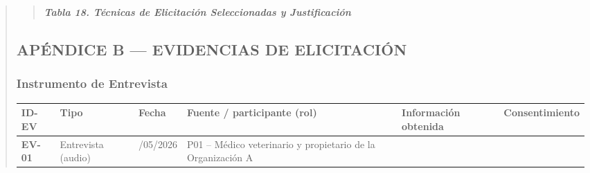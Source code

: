 \documentclass[
]{article}
\newcounter{none} %
\begin{document}
\begin{quote}
\begin{quote}
\protect{}\label{_bookmark74}{}\emph{\textbf{Tabla 18.
Técnicas de Elicitación Seleccionadas y Justificación}}
\end{quote}

\subsection{APÉNDICE B --- EVIDENCIAS DE
ELICITACIÓN}\label{apuxe9ndice-b-evidencias-de-elicitaciuxf3n}

\subsubsection{Instrumento de
Entrevista}\label{instrumento-de-entrevista}

{\def\LTcaptype{none} %
\begin{longtable}[]{|
  >{\raggedright\arraybackslash}p{}|
  >{\raggedright\arraybackslash}p{}|
  >{\centering\arraybackslash}p{}|
  >{\raggedright\arraybackslash}p{}|
  >{\raggedright\arraybackslash}p{}|
  >{\raggedright\arraybackslash}p{}|}
\hline
\begin{minipage}[b]{\linewidth}\raggedright
\textbf{ID-EV}
\end{minipage} & \begin{minipage}[b]{\linewidth}\centering
\textbf{Tipo}
\end{minipage} & \begin{minipage}[b]{\linewidth}\centering
\textbf{Fecha}
\end{minipage} & \begin{minipage}[b]{\linewidth}\raggedright
\textbf{Fuente / participante (rol)}
\end{minipage} & \begin{minipage}[b]{\linewidth}\raggedright
\textbf{Información obtenida}
\end{minipage} & \begin{minipage}[b]{\linewidth}\raggedright
\textbf{Consenti\-miento}
\end{minipage} \\
\hline
\endhead
\hline
\endlastfoot
\textbf{EV-01} & Entrevista (audio) & 23/05/2026 & P01
-- Médico veterinario y propietario de la Organización A &

\end{longtable}}
\end{quote}
\end{document}
